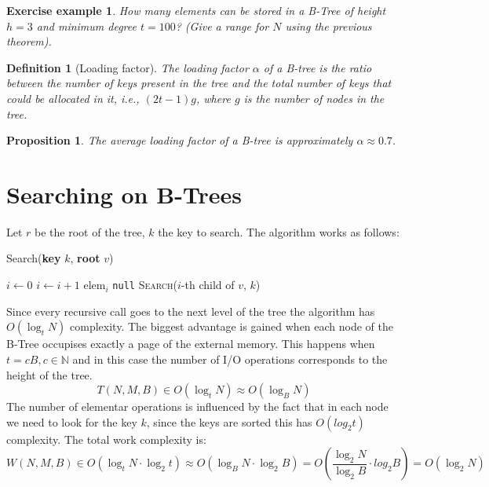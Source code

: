 \documentclass{report}
\newtheorem{defin}{Definition}[chapter]
\newtheorem{prop}{Proposition}[chapter]
\newtheorem{es}{Exercise example}[chapter]
\begin{document}
\begin{es}
    How many elements can be stored in a B-Tree of height \(h=3\) and minimum degree \(t=100\)? (Give a range for \(N\) using the previous theorem).
\end{es}
\begin{defin}[Loading factor]
    The loading factor \( \alpha \) of a B-tree is the ratio between the number of keys present in the tree and the total number of keys that could be allocated in it, i.e., \( (2t - 1)g \), where \( g \) is the number of nodes in the tree.
\end{defin}
\begin{prop}
    The average loading factor of a B-tree is approximately \(\alpha \approx 0.7 \).  
\end{prop}
\section{Searching on B-Trees}
Let \(r\) be the root of the tree, \(k\) the key to search. The algorithm works as follows:
\begin{algorithm}[H]
    \caption{Search(\textbf{key} \(k\), \textbf{root} \(v\))}
    \label{alg:b_tree_search}
    \begin{algorithmic}[1]
    \State \( i \gets 0 \)
        \State \( i \gets i+1 \)
    \EndWhile
        \State \Return \( \text{elem}_i \)
    \Else
            \State \Return \texttt{null}
        \Else
            \State \Return \textsc{Search}(\( i \)-th child of \( v \), \( k \))
        \EndIf
    \EndIf
    \end{algorithmic}
\end{algorithm}
\noindent
Since every recursive call goes to the next level of the tree the algorithm has \(O(\log_t N)\) complexity. The biggest advantage is gained when each node of the B-Tree occupises exactly a page of the external memory. This happens when \(t = c B, c \in \mathbb{N}\) and in this case the number of I/O operations corresponds to the height of the tree.
\begin{equation}
    T(N,M,B) \in O(\log_t N) \approx O(\log_B N) 
\end{equation}
\noindent
The number of elementar operations is influenced by the fact that in each node we need to look for the key \(k\), since the keys are sorted this has \(O(log_2 t)\) complexity. The total work complexity is:
\begin{equation}
    W(N,M,B) \in O(\log_t N \cdot \log_2 t) \approx O(\log_B N \cdot \log_2 B) = O\left(\frac{\log_2 N}{\log_2 B} \cdot log_2 B\right) = O(\log_2 N)
\end{equation}
\end{document}
